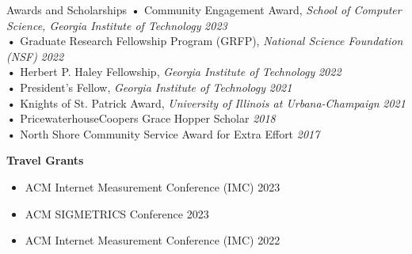 \documentclass{resume} %
\begin{document}
	\begin{rSection}{Awards and Scholarships} 
		\textbf{•} {Community Engagement Award, \textit{School of Computer Science, Georgia Institute of Technology}} \hfill {\em 2023}
		\vspace{3mm}\\
		\textbf{•} {Graduate Research Fellowship Program (GRFP), \textit{National Science Foundation (NSF)}} \hfill {\em 2022}
		\vspace{3mm}\\
		\textbf{•} {Herbert P. Haley Fellowship, \textit{Georgia Institute of Technology}} \hfill {\em 2022}
		\vspace{3mm}\\
		\textbf{•} {President's Fellow, \textit{Georgia Institute of Technology}} \hfill {\em 2021}
		\vspace{3mm}\\
		\textbf{•} {Knights of St. Patrick Award, \textit{University of Illinois at Urbana-Champaign}} \hfill {\em 2021}
		\vspace{3mm}\\
		\textbf{•} {PricewaterhouseCoopers Grace Hopper Scholar} \hfill {\em 2018}
		\vspace{3mm}\\
		\textbf{•} {North Shore Community Service Award for Extra Effort} \hfill {\em 2017}
		
		\textbf{Travel Grants}
		\begin{itemize}
			\item ACM Internet Measurement Conference (IMC) 2023
			\item ACM SIGMETRICS Conference 2023
			\item ACM Internet Measurement Conference (IMC) 2022
		\end{itemize}
		
		
	\end{rSection}
\end{document}

